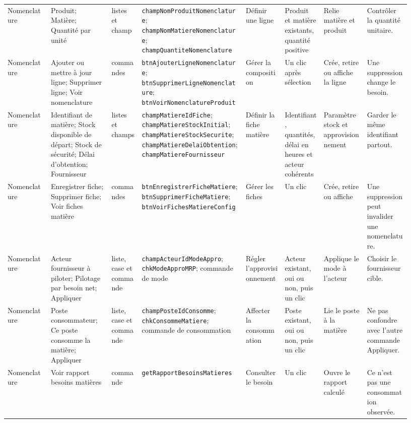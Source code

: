 \begin{landscape}
{\begin{longtable}{L{0.10\linewidth} L{0.14\linewidth} L{0.07\linewidth} L{0.24\linewidth} L{0.09\linewidth} L{0.09\linewidth} L{0.10\linewidth} L{0.10\linewidth}}
Nomenclature & Produit; Matière; Quantité par unité & listes et champ & \texttt{champNomProduitNomenclature}; \texttt{champNomMatiereNomenclature}; \texttt{champQuantiteNomenclature} & Définir une ligne & Produit et matière existants, quantité positive & Relie matière et produit & Contrôler la quantité unitaire. \\
Nomenclature & Ajouter ou mettre à jour ligne; Supprimer ligne; Voir nomenclature & commandes & \texttt{btnAjouterLigneNomenclature}; \texttt{btnSupprimerLigneNomenclature}; \texttt{btnVoirNomenclatureProduit} & Gérer la composition & Un clic après sélection & Crée, retire ou affiche la ligne & Une suppression change le besoin. \\
Nomenclature & Identifiant de matière; Stock disponible de départ; Stock de sécurité; Délai d'obtention; Fournisseur & listes et champs & \texttt{champMatiereIdFiche}; \texttt{champMatiereStockInitial}; \texttt{champMatiereStockSecurite}; \texttt{champMatiereDelaiObtention}; \texttt{champMatiereFournisseur} & Définir la fiche matière & Identifiant, quantités, délai en heures et acteur cohérents & Paramètre stock et approvisionnement & Garder le même identifiant partout. \\
Nomenclature & Enregistrer fiche; Supprimer fiche; Voir fiches matière & commandes & \texttt{btnEnregistrerFicheMatiere}; \texttt{btnSupprimerFicheMatiere}; \texttt{btnVoirFichesMatiereConfig} & Gérer les fiches & Un clic & Crée, retire ou affiche & Une suppression peut invalider une nomenclature. \\
Nomenclature & Acteur fournisseur à piloter; Pilotage par besoin net; Appliquer & liste, case et commande & \texttt{champActeurIdModeAppro}; \texttt{chkModeApproMRP}; commande de mode & Régler l'approvisionnement & Acteur existant, oui ou non, puis un clic & Applique le mode à l'acteur & Choisir le fournisseur cible. \\
Nomenclature & Poste consommateur; Ce poste consomme la matière; Appliquer & liste, case et commande & \texttt{champPosteIdConsomme}; \texttt{chkConsommeMatiere}; commande de consommation & Affecter la consommation & Poste existant, oui ou non, puis un clic & Lie le poste à la matière & Ne pas confondre avec l'autre commande Appliquer. \\
Nomenclature & Voir rapport besoins matières & commande & \texttt{getRapportBesoinsMatieres} & Consulter le besoin & Un clic & Ouvre le rapport calculé & Ce n'est pas une consommation observée. \\


\end{longtable}}
\end{landscape}
